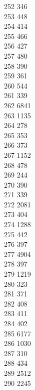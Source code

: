 { 252	346 \\
 253	448 \\
 254	414 \\
 255	466 \\
 256	427 \\
 257	480 \\
 258	390 \\
 259	361 \\
 260	544 \\
 261	339 \\
 262	6841 \\
 263	1135 \\
 264	278 \\
 265	353 \\
 266	373 \\
 267	1152 \\
 268	478 \\
 269	244 \\
 270	390 \\
 271	339 \\
 272	2081 \\
 273	404 \\
 274	1288 \\
 275	442 \\
 276	397 \\
 277	4904 \\
 278	397 \\
 279	1219 \\
 280	323 \\
 281	371 \\
 282	408 \\
 283	411 \\
 284	402 \\
 285	6177 \\
 286	1030 \\
 287	310 \\
 288	434 \\
 289	2512 \\
 290	2245 \\
}
